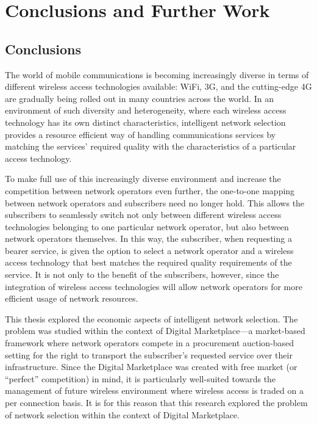 \chapter{Conclusions and Further Work}
\label{cha:conclusions}

\minitoc
\vspace{10mm}

\section{Conclusions} %
\label{sec:conclusions_conclusions}
The world of mobile communications is becoming increasingly diverse in terms of different wireless access technologies available: WiFi, 3G, and the cutting-edge 4G are gradually being rolled out in many countries across the world. In an environment of such diversity and heterogeneity, where each wireless access technology has its own distinct characteristics, intelligent network selection provides a resource efficient way of handling communications services by matching the services' required quality with the characteristics of a particular access technology.

To make full use of this increasingly diverse environment and increase the competition between network operators even further, the one-to-one mapping between network operators and subscribers need no longer hold. This allows the subscribers to seamlessly switch not only between different wireless access technologies belonging to one particular network operator, but also between network operators themselves. In this way, the subscriber, when requesting a bearer service, is given the option to select a network operator and a wireless access technology that best matches the required quality requirements of the service. It is not only to the benefit of the subscribers, however, since the integration of wireless access technologies will allow network operators for more efficient usage of network resources.

This thesis explored the economic aspects of intelligent network selection. The problem was studied within the context of Digital Marketplace---a market-based framework where network operators compete in a procurement auction-based setting for the right to transport the subscriber's requested service over their infrastructure. Since the Digital Marketplace was created with free market (or ``perfect'' competition) in mind, it is particularly well-suited towards the management of future wireless environment where wireless access is traded on a per connection basis. It is for this reason that this research explored the problem of network selection within the context of Digital Marketplace.

